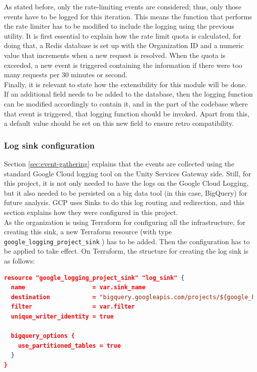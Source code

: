 \documentclass[english, 12pt, a4paper, sci, utf8, a-1b, online]{aaltothesis}
\begin{document}
As stated before, only the rate-limiting events are considered; thus, only those events have to be logged for this iteration. This means the function that performs the rate limiter has to be modified to include the logging using the previous utility. It is first essential to explain how the rate limit quota is calculated, for doing that, a Redis database is set up with the Organization ID and a numeric value that increments when a new request is resolved. When the quota is exceeded, a new event is triggered containing the information if there were too many requests per 30 minutes or second.\\

Finally, it is relevant to state how the extensibility for this module will be done. If an additional field needs to be added to the database, then the logging function can be modified accordingly to contain it, and in the part of the codebase where that event is triggered, that logging function should be invoked. Apart from this, a default value should be set on this new field to ensure retro compatibility.

\subsubsection{Log sink configuration}

Section \ref{sec:event-gathering} explains that the events are collected using the standard Google Cloud logging tool on the Unity Services Gateway side. Still, for this project, it is not only needed to have the logs on the Google Cloud Logging, but it also needed to be persisted on a big data tool (in this case, BigQuery) for future analysis. GCP uses Sinks \cite{GCPSinks} to do this log routing and redirection, and this section explains how they were configured in this project.\\

As the organization is using Terraform for configuring all the infrastructure, for creating this sink, a new Terraform resource (with type \texttt{google\_logging\_project\_sink} \cite{TerraformGoogleSink}) has to be added. Then the configuration has to be applied to take effect. On Terraform, the structure for creating the log sink is as follows:\\

\begin{lstlisting}[language=json,firstnumber=1]
resource "google_logging_project_sink" "log_sink" {
  name                   = var.sink_name
  destination            = "bigquery.googleapis.com/projects/${google_bigquery_dataset.dataset.project}/datasets/${google_bigquery_dataset.dataset.dataset_id}"
  filter                 = var.filter
  unique_writer_identity = true

  bigquery_options {
    use_partitioned_tables = true
  }
}
\end{lstlisting}
\end{document}
